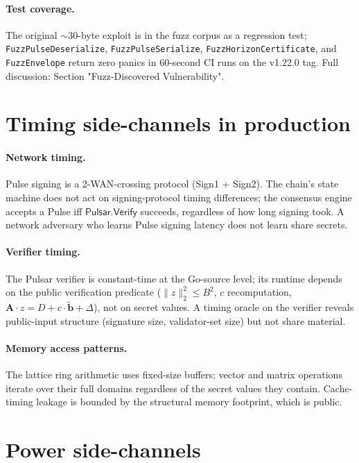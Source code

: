 \documentclass[11pt,a4paper]{article}
\begin{document}
\paragraph{Test coverage.} The original $\sim 30$-byte exploit is in the fuzz corpus as a regression test; \texttt{FuzzPulseDeserialize}, \texttt{FuzzPulseSerialize}, \texttt{FuzzHorizonCertificate}, and \texttt{FuzzEnvelope} return zero panics in 60-second CI runs on the v1.22.0 tag. Full discussion: \cite{luxwarpv2} Section "Fuzz-Discovered Vulnerability".

\section{Timing side-channels in production}

\paragraph{Network timing.} Pulse signing is a 2-WAN-crossing protocol (Sign1 + Sign2). The chain's state machine does not act on signing-protocol timing differences; the consensus engine accepts a Pulse iff $\mathsf{Pulsar.Verify}$ succeeds, regardless of how long signing took. A network adversary who learns Pulse signing latency does not learn share secrets.

\paragraph{Verifier timing.} The Pulsar verifier is constant-time at the Go-source level; its runtime depends on the public verification predicate ($\|z\|_2^2 \leq B^2$, $c$ recomputation, $\mathbf{A} \cdot z = D + c\cdot\tilde{\mathbf{b}} + \Delta$), not on secret values. A timing oracle on the verifier reveals public-input structure (signature size, validator-set size) but not share material.

\paragraph{Memory access patterns.} The lattice ring arithmetic uses fixed-size buffers; vector and matrix operations iterate over their full domains regardless of the secret values they contain. Cache-timing leakage is bounded by the structural memory footprint, which is public.

\section{Power side-channels}
\end{document}
